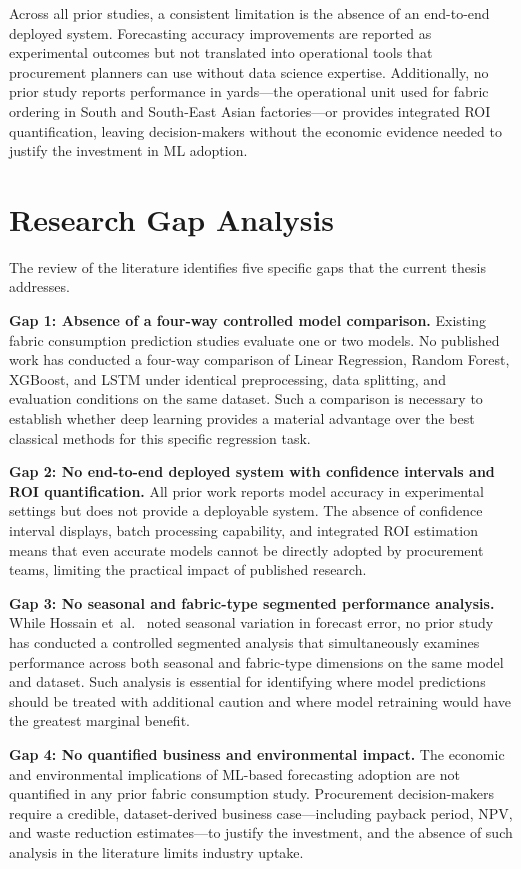 Across all prior studies, a consistent limitation is the absence of an end-to-end deployed system. Forecasting accuracy improvements are reported as experimental outcomes but not translated into operational tools that procurement planners can use without data science expertise. Additionally, no prior study reports performance in yards---the operational unit used for fabric ordering in South and South-East Asian factories---or provides integrated ROI quantification, leaving decision-makers without the economic evidence needed to justify the investment in ML adoption.

\secdiv
\section{Research Gap Analysis}
The review of the literature identifies five specific gaps that the current thesis addresses.

\textbf{Gap 1: Absence of a four-way controlled model comparison.} Existing fabric consumption prediction studies evaluate one or two models. No published work has conducted a four-way comparison of Linear Regression, Random Forest, XGBoost, and LSTM under identical preprocessing, data splitting, and evaluation conditions on the same dataset. Such a comparison is necessary to establish whether deep learning provides a material advantage over the best classical methods for this specific regression task.

\textbf{Gap 2: No end-to-end deployed system with confidence intervals and ROI quantification.} All prior work reports model accuracy in experimental settings but does not provide a deployable system. The absence of confidence interval displays, batch processing capability, and integrated ROI estimation means that even accurate models cannot be directly adopted by procurement teams, limiting the practical impact of published research.

\textbf{Gap 3: No seasonal and fabric-type segmented performance analysis.} While Hossain et~al.\ \cite{hossain2020seasonal} noted seasonal variation in forecast error, no prior study has conducted a controlled segmented analysis that simultaneously examines performance across both seasonal and fabric-type dimensions on the same model and dataset. Such analysis is essential for identifying where model predictions should be treated with additional caution and where model retraining would have the greatest marginal benefit.

\textbf{Gap 4: No quantified business and environmental impact.} The economic and environmental implications of ML-based forecasting adoption are not quantified in any prior fabric consumption study. Procurement decision-makers require a credible, dataset-derived business case---including payback period, NPV, and waste reduction estimates---to justify the investment, and the absence of such analysis in the literature limits industry uptake.

